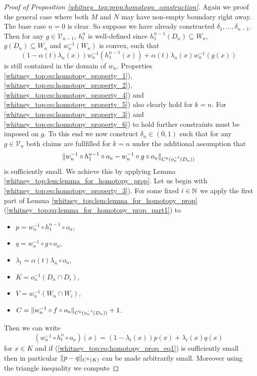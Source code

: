\begin{proof}[Proof of Proposition \ref{whitney_top:prop:homotopy_construction}]
    Again we proof the general case where both $M$ and $N$ may have non-empty boundary right away. The base case $n=0$ is clear. So suppose we have already constructed $\delta_1,\ldots,\delta_{n-1}$. Then for any $g \in \mathcal{V}_{n-1}$, $h_t^n$ is well-defined since $h_1^{n-1}(D_n) \subseteq W_n$, $g(D_n) \subseteq W_n$ and $w_n^{-1}(W_n)$ is convex, such that 
    \[
    (1-\alpha(t)\lambda_n(x)) w_n^{-1}(h_1^{n-1}(x)) + \alpha(t)\lambda_n(x)w_n^{-1}(g(x))
    \]
    is still contained in the domain of $w_n$. Properties \ref{whitney_top:eq:homotopy_property_1}), \ref{whitney_top:eq:homotopy_property_2}), \ref{whitney_top:eq:homotopy_property_4}) and \ref{whitney_top:eq:homotopy_property_5}) also clearly hold for $k = n$. For \ref{whitney_top:eq:homotopy_property_3}) and \ref{whitney_top:eq:homotopy_property_6}) to hold further constraints must be imposed on $g$. To this end we now construct $\delta_n \in (0,1)$ such that for any $g \in \mathcal{V}_n$ both claims are fullfilled for $k = n$ under the additional assumption that 
    \begin{equation}
        \label{whitney_top:eq:homotopy_prop_eq1}
    \lVert w_n^{-1} \circ h_1^{n-1} \circ o_n - w_n^{-1} \circ g \circ o_n\rVert_{C^k(o_n^{-1}(D_n))}
    \end{equation}
    is sufficiently small. We achieve this by applying Lemma \ref{whitney_top:lem:lemma_for_homotopy_prop}. Let us begin with \ref{whitney_top:eq:homotopy_property_3}). For some fixed $i \in \mathbb{N}$ we apply the first part of Lemma \ref{whitney_top:lem:lemma_for_homotopy_prop} (\ref{whitney_top:eq:lemma_for_homotopy_prop_part1}) to 
    \begin{itemize}
        \item $p = w_n^{-1} \circ h_1^{n-1} \circ o_n$,
        \item $q = w_n^{-1} \circ g \circ o_n$,
        \item $\lambda_t = \alpha(t)\lambda_n \circ o_n$,
        \item $K = o_n^{-1}(D_n \cap D_i)$,
        \item $V = w_n^{-1}(W_n \cap W_i)$,
        \item $C = \lVert w_n^{-1} \circ f \circ o_n\rVert_{C^k(o_n^{-1}(D_n))} + 1$.
    \end{itemize}
    Then we can write 
    \[
    (w_n^{-1} \circ h_t^n \circ o_n)(x) = (1-\lambda_t(x))p(x) + \lambda_t(x) q(x)
    \]
    for $x \in K$ and if (\ref{whitney_top:eq:homotopy_prop_eq1}) is sufficiently small then in particular $\lVert p-q\rVert_{C^k(K)}$ can be made arbitrarily small. Moreover using the triangle inequality we compute

\end{proof}
